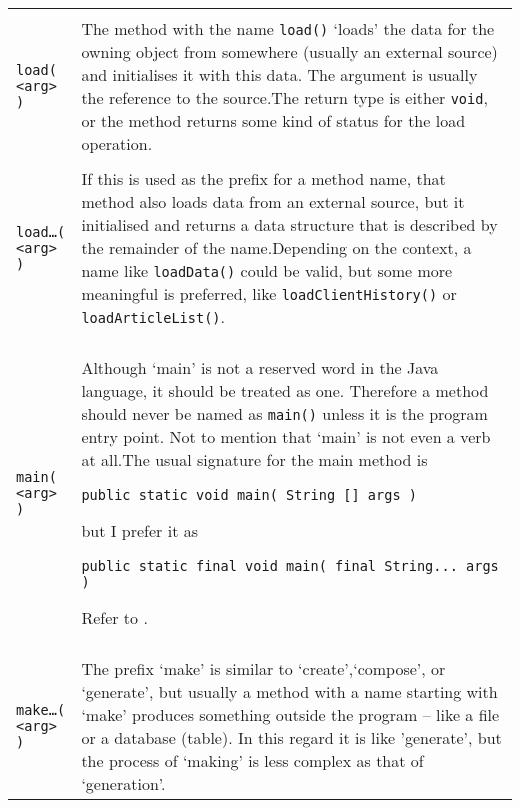 \begin{longtable}{|l|X|}
    \makecell{\lstinline|load()| \\ \lstinline|load( <arg> )|} & The method with the name \lstinline|load()| ‘loads’ the data for the owning object from somewhere (usually an external source) and initialises it with this data. The argument is usually the reference to the source.\newline The return type is either \lstinline|void|, or the method returns some kind of status for the load operation.\\
    \hline

    \makecell{\lstinline|load…()| \\ \lstinline|load…( <arg> )|} & If this is used as the prefix for a method name, that method also loads data from an external source, but it initialised and returns a data structure that is described by the remainder of the name.\newline Depending on the context, a name like \lstinline|loadData()| could be valid, but some more meaningful is preferred, like \lstinline|loadClientHistory()| or \lstinline|loadArticleList()|. \\
    \hline

    \makecell{\lstinline|main()| \\ \lstinline|main( <arg> )|} & Although ‘main’ is not a reserved word in the Java language, it should be treated as one. Therefore a method should never be named as \lstinline|main()| unless it is the program entry point. Not to mention that ‘main’ is not even a verb at all.\newline The usual signature for the main method is
\begin{lstlisting}
public static void main( String [] args )
\end{lstlisting}
but I prefer it as
\begin{lstlisting}
public static final void main( final String... args )
\end{lstlisting}
Refer to \autocite{ORACLE_DOC_LANGUAGE_SPECIFICATION:Invoke_Test.main}. \\
    \hline

    \makecell{\lstinline|make…()| \\ \lstinline|make…( <arg> )|} & The prefix ‘make’ is similar to ‘create’,‘compose’, or ‘generate’, but usually a method with a name starting with ‘make’ produces something outside the program – like a file or a database (table). In this regard it is like ’generate’, but the process of ‘making’ is less complex as that of ‘generation’. \\
    \hline


\end{longtable}
